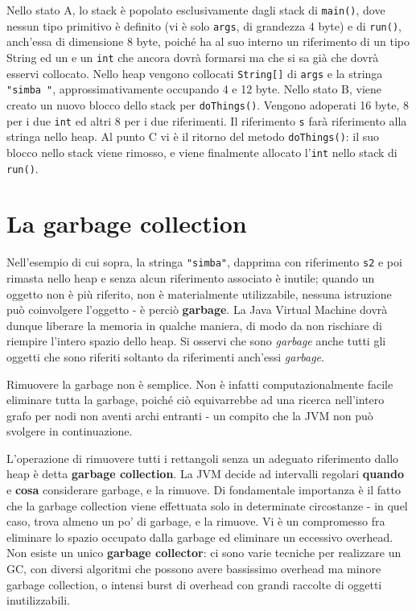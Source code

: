 \documentclass[\fontsizeclass,twocolumn]{\classname}
\theoremstyle{definition}
\theoremstyle{definition}
\begin{document}
Nello stato A, lo stack è popolato esclusivamente dagli stack di
\texttt{main()}, dove nessun tipo primitivo è definito (vi è solo
\texttt{args}, di grandezza 4 byte) e di \texttt{run()}, anch'essa di
dimensione 8 byte, poiché ha al suo interno un riferimento di un tipo String ed
un e un \texttt{int} che ancora dovrà formarsi ma che si sa già che dovrà
esservi collocato. Nello heap vengono collocati \texttt{String[]} di
\texttt{args} e la stringa \texttt{"simba "}, approssimativamente occupando 4 e
12 byte. Nello stato B, viene creato un nuovo blocco dello stack per
\texttt{doThings()}. Vengono adoperati 16 byte, 8 per i due \texttt{int} ed
altri 8 per i due riferimenti. Il riferimento \texttt{s} farà riferimento alla
stringa nello heap. Al punto C vi è il ritorno del metodo \texttt{doThings()}:
il suo blocco nello stack viene rimosso, e viene finalmente allocato
l'\texttt{int} nello stack di \texttt{run()}.

\section{La garbage collection}

Nell'esempio di cui sopra, la stringa \texttt{"simba"}, dapprima con
riferimento \texttt{s2} e poi rimasta nello heap e senza alcun riferimento
associato è inutile; quando un oggetto non è più riferito, non è materialmente
utilizzabile, nessuna istruzione può coinvolgere l'oggetto \-- è perciò
\textbf{garbage}. La Java Virtual Machine dovrà dunque liberare la memoria in
qualche maniera, di modo da non rischiare di riempire l'intero spazio dello
heap. Si osservi che sono \emph{garbage} anche tutti gli oggetti che sono
riferiti soltanto da riferimenti anch'essi \emph{garbage}.

Rimuovere la garbage non è semplice. 
Non è infatti computazionalmente facile eliminare tutta la garbage, poiché ciò
equivarrebbe ad una ricerca nell'intero grafo per nodi non aventi archi
entranti \-- un compito che la JVM non può svolgere in continuazione.

L'operazione di rimuovere tutti i rettangoli senza un adeguato riferimento
dallo heap è detta \textbf{garbage collection}. La JVM decide ad intervalli
regolari \textbf{quando} e \textbf{cosa} considerare garbage, e la rimuove.
Di fondamentale importanza è il fatto che la garbage collection viene
effettuata solo in determinate circostanze \-- in quel caso, trova almeno un
po' di garbage, e la rimuove. Vi è un compromesso fra eliminare lo spazio
occupato dalla garbage ed eliminare un eccessivo overhead. Non esiste un unico
\textbf{garbage collector}: ci sono varie tecniche per realizzare un GC, con
diversi algoritmi che possono avere bassissimo overhead ma minore garbage
collection, o intensi burst di overhead con grandi raccolte di oggetti
inutilizzabili.
\end{document}
